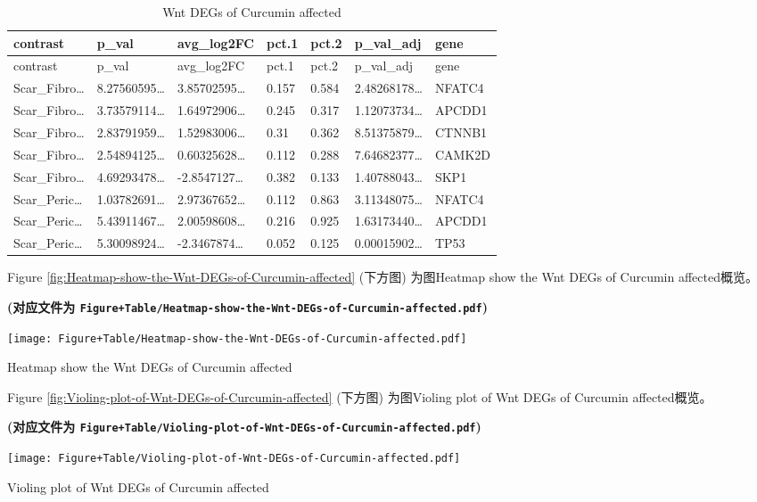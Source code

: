 \documentclass[
]{article}
\begin{document}
\begin{longtable}[]{@{}lllllll@{}}
\caption{\label{tab:Wnt-DEGs-of-Curcumin-affected}Wnt DEGs of Curcumin affected}\tabularnewline
\toprule
contrast & p\_val & avg\_log2FC & pct.1 & pct.2 & p\_val\_adj & gene\tabularnewline
\midrule
\endfirsthead
\toprule
contrast & p\_val & avg\_log2FC & pct.1 & pct.2 & p\_val\_adj & gene\tabularnewline
\midrule
\endhead
Scar\_Fibro\ldots{} & 8.27560595\ldots{} & 3.85702595\ldots{} & 0.157 & 0.584 & 2.48268178\ldots{} & NFATC4\tabularnewline
Scar\_Fibro\ldots{} & 3.73579114\ldots{} & 1.64972906\ldots{} & 0.245 & 0.317 & 1.12073734\ldots{} & APCDD1\tabularnewline
Scar\_Fibro\ldots{} & 2.83791959\ldots{} & 1.52983006\ldots{} & 0.31 & 0.362 & 8.51375879\ldots{} & CTNNB1\tabularnewline
Scar\_Fibro\ldots{} & 2.54894125\ldots{} & 0.60325628\ldots{} & 0.112 & 0.288 & 7.64682377\ldots{} & CAMK2D\tabularnewline
Scar\_Fibro\ldots{} & 4.69293478\ldots{} & -2.8547127\ldots{} & 0.382 & 0.133 & 1.40788043\ldots{} & SKP1\tabularnewline
Scar\_Peric\ldots{} & 1.03782691\ldots{} & 2.97367652\ldots{} & 0.112 & 0.863 & 3.11348075\ldots{} & NFATC4\tabularnewline
Scar\_Peric\ldots{} & 5.43911467\ldots{} & 2.00598608\ldots{} & 0.216 & 0.925 & 1.63173440\ldots{} & APCDD1\tabularnewline
Scar\_Peric\ldots{} & 5.30098924\ldots{} & -2.3467874\ldots{} & 0.052 & 0.125 & 0.00015902\ldots{} & TP53\tabularnewline
\bottomrule
\end{longtable}

Figure \ref{fig:Heatmap-show-the-Wnt-DEGs-of-Curcumin-affected} (下方图) 为图Heatmap show the Wnt DEGs of Curcumin affected概览。

\textbf{(对应文件为 \texttt{Figure+Table/Heatmap-show-the-Wnt-DEGs-of-Curcumin-affected.pdf})}

\def\@captype{figure}
\begin{center}
\texttt{[image: Figure+Table/Heatmap-show-the-Wnt-DEGs-of-Curcumin-affected.pdf]}
\caption{Heatmap show the Wnt DEGs of Curcumin affected}\label{fig:Heatmap-show-the-Wnt-DEGs-of-Curcumin-affected}
\end{center}

Figure \ref{fig:Violing-plot-of-Wnt-DEGs-of-Curcumin-affected} (下方图) 为图Violing plot of Wnt DEGs of Curcumin affected概览。

\textbf{(对应文件为 \texttt{Figure+Table/Violing-plot-of-Wnt-DEGs-of-Curcumin-affected.pdf})}

\def\@captype{figure}
\begin{center}
\texttt{[image: Figure+Table/Violing-plot-of-Wnt-DEGs-of-Curcumin-affected.pdf]}
\caption{Violing plot of Wnt DEGs of Curcumin affected}\label{fig:Violing-plot-of-Wnt-DEGs-of-Curcumin-affected}
\end{center}
\end{document}
